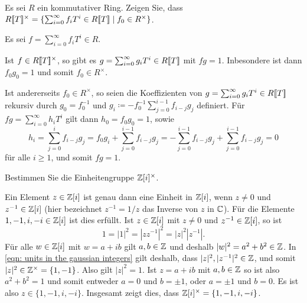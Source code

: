 \begin{question}[subtitle = Die Einheitengruppe des Potenzreihenrings]
  \label{question: unit group of the power series ring}
  Es sei $R$ ein kommutativer Ring.
  Zeigen Sie, dass $R[\![T]\!]^\times = \{\sum_{i=0}^\infty f_i T^i \in R[\![T]\!] \mid f_0 \in R^\times\}$.
\end{question}


\begin{solution}
  Es sei $f = \sum_{i=0}^\infty f_i T^i \in R$.
  
  Ist $f \in R[\![T]\!]^\times$, so gibt es $g = \sum_{i=0}^\infty g_i T^i \in R[\![T]\!]$ mit $fg = 1$.
  Inbesondere ist dann $f_0 g_0 = 1$ und somit $f_0 \in R^\times$.
  
  Ist andererseits $f_0 \in R^\times$, so seien die Koeffizienten von $g = \sum_{i=0}^\infty g_i T^i \in R[\![T]\!]$ rekursiv durch $g_0 = f_0^{-1}$ und $g_i \coloneqq - f_0^{-1} \sum_{j=0}^{i-1} f_{i-j} g_j$ definiert.
  Für $fg = \sum_{i=0}^\infty h_i T^i$ gilt dann $h_0 = f_0 g_0 = 1$, sowie
  \[
      h_i
    = \sum_{j=0}^i f_{i-j} g_j
    = f_0 g_i + \sum_{j=0}^{i-1} f_{i-j} g_j
    = - \sum_{j=0}^{i-1} f_{i-j} g_j + \sum_{j=0}^{i-1} f_{i-j} g_j
    = 0
  \]
  für alle $i \geq 1$, und somit $fg = 1$.
\end{solution}


\begin{question}[subtitle = Einheitengruppe der Gaußschen Zahlen]
  Bestimmen Sie die Einheitengruppe $\mathbb{Z}[i]^\times$.
\end{question}


\begin{solution}
  Ein Element $z \in \mathbb{Z}[i]$ ist genau dann eine Einheit in $\mathbb{Z}[i]$, wenn $z \neq 0$ und $z^{-1} \in \mathbb{Z}[i]$ (hier bezeichnet $z^{-1} = 1/z$ das Inverse von $z$ in $\mathbb{C}$).
  Für die Elemente $1, -1, i, -i \in \mathbb{Z}[i]$ ist dies erfüllt.
  Ist $z \in \mathbb{Z}[i]$ mit $z \neq 0$ und $z^{-1} \in \mathbb{Z}[i]$, so ist
  \begin{equation}
    \label{eqn: units in the gaussian integers}
      1
    = |1|^2
    = |z z^{-1}|^2
    = |z|^2 |z^{-1}|.
  \end{equation}
  Für alle $w \in \mathbb{Z}[i]$ mit $w = a + ib$ gilt $a, b \in \mathbb{Z}$ und deshalb $|w|^2 = a^2 + b^2 \in \mathbb{Z}$.
  In \eqref{eqn: units in the gaussian integers} gilt deshalb, dass $|z|^2, |z^{-1}|^2 \in \mathbb{Z}$, und somit $|z|^2 \in \mathbb{Z}^\times = \{1,-1\}$.
  Also gilt $|z|^2 = 1$.
  Ist $z = a + ib$ mit $a,b \in \mathbb{Z}$ so ist also $a^2 + b^2 = 1$ und somit entweder $a = 0$ und $b = \pm 1$, oder $a = \pm 1$ und $b = 0$.
  Es ist also $z \in \{1, -1, i, -i\}$.
  Insgesamt zeigt dies, dass $\mathbb{Z}[i]^\times = \{1, -1, i, -i\}$.
\end{solution}


